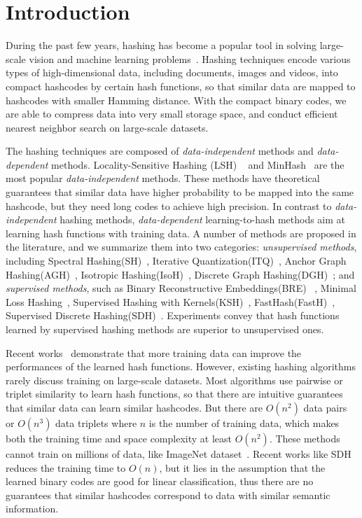 \documentclass[conference]{IEEEtran}
\begin{document}
\section{Introduction}

During the past few years, hashing has become a popular tool in solving large-scale vision and machine learning problems~\cite{li2011hashing,liu2012supervised,li2013sign}. Hashing techniques encode various types of high-dimensional data, including documents, images and videos, into compact hashcodes by certain hash functions, so that similar data are mapped to hashcodes with smaller Hamming distance. With the compact binary codes, we are able to compress data into very small storage space, and conduct efficient nearest neighbor search on large-scale datasets.

The hashing techniques are composed of {\em data-independent} methods and {\em data-dependent} methods. Locality-Sensitive Hashing (LSH) ~\cite{datar2004locality,gionis1999similarity} and MinHash~\cite{broder1998min} are the most popular {\em data-independent} methods. These methods have theoretical guarantees that similar data have higher probability to be mapped into the same hashcode, but they need long codes to achieve high precision. In contrast to {\em data-independent} hashing methods, {\em data-dependent} learning-to-hash methods aim at learning hash functions with training data. A number of methods are proposed in the literature, and we summarize them into two categories: {\em unsupervised methods}, including Spectral Hashing(SH)~\cite{weiss2009spectral}, Iterative Quantization(ITQ)~\cite{gong2013iterative}, Anchor Graph Hashing(AGH)~\cite{liu2011hashing}, Isotropic Hashing(IsoH)~\cite{kong2012isotropic}, Discrete Graph Hashing(DGH)~\cite{liu2014discrete}; and {\em supervised methods}, such as Binary Reconstructive Embeddings(BRE) ~\cite{kulis2009learning}, Minimal Loss Hashing~\cite{norouzi2011minimal}, Supervised Hashing with Kernels(KSH)~\cite{liu2012supervised}, FastHash(FastH)~\cite{lin2014fast}, Supervised Discrete Hashing(SDH)~\cite{Shen_2015_CVPR}. Experiments convey that hash functions learned by supervised hashing methods are superior to unsupervised ones.

Recent works~\cite{Shen_2015_CVPR,lin2014fast} demonstrate that more training data can improve the performances of the learned hash functions. However, existing hashing algorithms rarely discuss training on large-scale datasets. Most algorithms use pairwise or triplet similarity to learn hash functions, so that there are intuitive guarantees that similar data can learn similar hashcodes. But there are $O(n^2)$ data pairs or $O(n^3)$ data triplets where $n$ is the number of training data, which makes both the training time and space complexity at least $O(n^2)$. These methods cannot train on millions of data, like ImageNet dataset~\cite{deng2009imagenet}. Recent works like SDH~\cite{Shen_2015_CVPR} reduces the training time to $O(n)$, but it lies in the assumption that the learned binary codes are good for linear classification, thus there are no guarantees that similar hashcodes correspond to data with similar semantic information.
\end{document}
